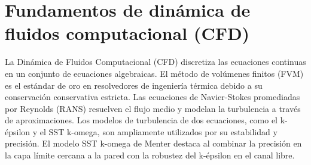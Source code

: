 \section{Fundamentos de dinámica de fluidos computacional (CFD)}
\label{sec:cap02_fundamentos_cfd}

La Dinámica de Fluidos Computacional (CFD) discretiza las ecuaciones continuas en un conjunto de ecuaciones algebraicas.
El método de volúmenes finitos (FVM) es el estándar de oro en resolvedores de ingeniería térmica debido a su conservación conservativa estricta.
Las ecuaciones de Navier-Stokes promediadas por Reynolds (RANS) resuelven el flujo medio y modelan la turbulencia a través de aproximaciones.
Los modelos de turbulencia de dos ecuaciones, como el k-épsilon y el SST k-omega, son ampliamente utilizados por su estabilidad y precisión.
El modelo SST k-omega de Menter destaca al combinar la precisión en la capa límite cercana a la pared con la robustez del k-épsilon en el canal libre.
